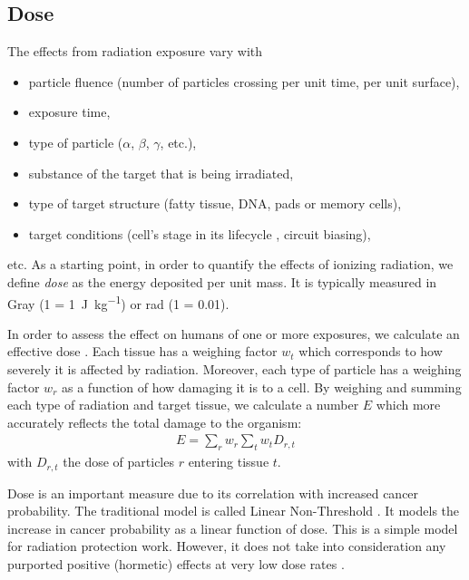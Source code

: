 \subsection{Dose}
The effects from radiation exposure vary with
\begin{itemize}
    \item particle fluence
        (number of particles crossing per unit time, per unit surface),
    \item exposure time,
    \item type of particle ($\alpha$, $\beta$, $\gamma$, etc.),
    \item substance of the target that is being irradiated,
    \item type of target structure (fatty tissue, DNA, pads or memory cells),
    \item target conditions (cell's stage in its lifecycle
        \cite{podgorsak_radiation_2005}, circuit biasing),
\end{itemize}etc.
As a starting point, in order to quantify the effects of ionizing radiation,
we define \emph{dose} as the energy deposited per unit mass.
It is typically measured in Gray 
(\SI{1}{\Gray} = \SI{1}{\joule\per\kilo\gram}) 
or rad
(\SI{1}{\rad} = \SI{0.01}{\Gray}).

In order to assess the effect on humans of one or more exposures,
we calculate an effective dose
\cite{martin_effective_2007}.
Each tissue has a weighing factor $w_t$ which corresponds to how severely it is affected by radiation.
Moreover, each type of particle has a weighing factor $w_r$
as a function of how damaging it is to a cell.
By weighing and summing each type of radiation and target tissue,
we calculate a number $E$ which more accurately reflects the total damage to the organism:
\begin{align*}
    E = \sum_r w_r \sum_t w_t D_{r,t}
\end{align*}
with $D_{r,t}$ the dose of particles $r$ entering tissue $t$.

Dose is an important measure due to its correlation with increased cancer probability.
The traditional model is called Linear Non-Threshold
\cite{valentin_low-dose_2006}.
It models the increase in cancer probability as a linear function of dose.
This is a simple model for radiation protection work.
However, it does not take into consideration any purported positive (hormetic)
effects at very low dose rates
\cite{hooker_linear_2004}.
